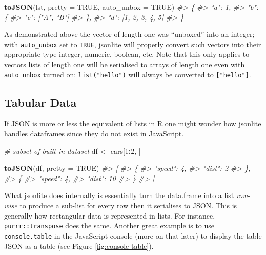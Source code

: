 \documentclass[10pt,]{krantz}
\makeatletter
\newenvironment{Shaded}{\begin{snugshade}}{\end{snugshade}}
\newcommand{\CommentTok}[1]{\textcolor[rgb]{0.37,0.37,0.37}{\textit{#1}}}
\newcommand{\DataTypeTok}[1]{\textcolor[rgb]{0.27,0.27,0.27}{#1}}
\newcommand{\DecValTok}[1]{\textcolor[rgb]{0.06,0.06,0.06}{#1}}
\newcommand{\KeywordTok}[1]{\textcolor[rgb]{0.27,0.27,0.27}{\textbf{#1}}}
\newcommand{\NormalTok}[1]{#1}
\newcommand{\OperatorTok}[1]{\textcolor[rgb]{0.43,0.43,0.43}{\textbf{#1}}}
\newcommand{\OtherTok}[1]{\textcolor[rgb]{0.37,0.37,0.37}{#1}}
\newcommand{\StringTok}[1]{\textcolor[rgb]{0.5,0.5,0.5}{#1}}
\newenvironment{kframe}{%
\medskip{}
\setlength{\fboxsep}{.8em}
 \def\at@end@of@kframe{}%
 \ifinner\ifhmode%
  \def\at@end@of@kframe{\end{minipage}}%
  \begin{minipage}{\columnwidth}%
 \fi\fi%
 \def\FrameCommand##1{\hskip\@totalleftmargin \hskip-\fboxsep
 \colorbox{shadecolor}{##1}\hskip-\fboxsep
     \hskip-\linewidth \hskip-\@totalleftmargin \hskip\columnwidth}%
 \MakeFramed {\advance\hsize-\width
   \@totalleftmargin\z@ \linewidth\hsize
   \@setminipage}}%
 {\par\unskip\endMakeFramed%
 \at@end@of@kframe}
\renewenvironment{Shaded}{\begin{kframe}}{\end{kframe}}
\makeatother
\begin{document}
\begin{Shaded}
\begin{Highlighting}[]
\KeywordTok{toJSON}\NormalTok{(lst, }\DataTypeTok{pretty =} \OtherTok{TRUE}\NormalTok{, }\DataTypeTok{auto_unbox =} \OtherTok{TRUE}\NormalTok{)}
\CommentTok{#> \{}
\CommentTok{#>   "a": 1,}
\CommentTok{#>   "b": \{}
\CommentTok{#>     "c": ["A", "B"]}
\CommentTok{#>   \},}
\CommentTok{#>   "d": [1, 2, 3, 4, 5]}
\CommentTok{#> \}}
\end{Highlighting}
\end{Shaded}

As demonstrated above the vector of length one was ``unboxed'' into an integer; with \texttt{auto\_unbox} set to \texttt{TRUE}, jsonlite will properly convert such vectors into their appropriate type integer, numeric, boolean, etc. Note that this only applies to vectors lists of length one will be serialised to arrays of length one even with \texttt{auto\_unbox} turned on: \texttt{list("hello")} will always be converted to \texttt{{[}"hello"{]}}.

\hypertarget{basics-tabular}{%
\subsection{Tabular Data}\label{basics-tabular}}

If JSON is more or less the equivalent of lists in R one might wonder how jsonlite handles dataframes since they do not exist in JavaScript.

\begin{Shaded}
\begin{Highlighting}[]
\CommentTok{# subset of built-in dataset}
\NormalTok{df <-}\StringTok{ }\NormalTok{cars[}\DecValTok{1}\OperatorTok{:}\DecValTok{2}\NormalTok{, ]}

\KeywordTok{toJSON}\NormalTok{(df, }\DataTypeTok{pretty =} \OtherTok{TRUE}\NormalTok{)}
\CommentTok{#> [}
\CommentTok{#>   \{}
\CommentTok{#>     "speed": 4,}
\CommentTok{#>     "dist": 2}
\CommentTok{#>   \},}
\CommentTok{#>   \{}
\CommentTok{#>     "speed": 4,}
\CommentTok{#>     "dist": 10}
\CommentTok{#>   \}}
\CommentTok{#> ]}
\end{Highlighting}
\end{Shaded}

What jsonlite does internally is essentially turn the data.frame into a list \emph{row-wise} to produce a sub-list for every row then it serialises to JSON. This is generally how rectangular data is represented in lists. For instance, \texttt{purrr::transpose} does the same. Another great example is to use \texttt{console.table} in the JavaScript console (more on that later) to display the table JSON as a table (see Figure \ref{fig:console-table}).
\end{document}
